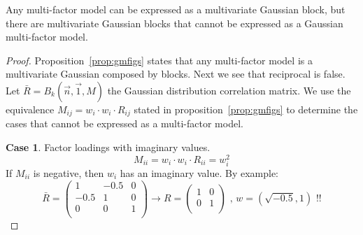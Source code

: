 \documentclass[11pt,fleqn]{book} %
\begin{document}
\begin{proposition}
	\label{prop:ibne}
	Any multi-factor model can be expressed as a multivariate Gaussian 
	block, but there are multivariate Gaussian blocks that cannot be 
	expressed as a Gaussian multi-factor model.
\end{proposition}
\begin{proof}
	Proposition~\ref{prop:gmfigs} states that any multi-factor model 
	is a multivariate Gaussian composed by blocks.
	Next we see that reciprocal is false. Let 
	$\bar{R} = B_k(\vec{n},\vec{1},M)$ the Gaussian distribution 
	correlation matrix. We use the equivalence 
	$M_{ij} = w_i \cdot w_i \cdot R_{ij}$ stated in 
	proposition~\ref{prop:gmfigs} to determine the cases that cannot be 
	expressed as a multi-factor model.

	\textbf{Case 1}. Factor loadings with imaginary values.
	\begin{displaymath}
		M_{ii} = w_i \cdot w_i \cdot R_{ii} = w_i^2
	\end{displaymath}
	If $M_{ii}$ is negative, then $w_i$ has an imaginary value.
	By example:
	\begin{displaymath}
		\bar{R} = \left(
		\begin{array}{cc|c}
			1    & -0.5 & 0 \\
			-0.5 & 1    & 0 \\
			\hline
			0    & 0    & 1 \\
		\end{array}
		\right) 
		\longrightarrow
		R = \left(
		\begin{array}{cc}
			1 & 0 \\
			0 & 1 \\
		\end{array}
		\right)
		\text{ , }
		w = (\sqrt{-0.5}, 1)
		\text{ !!}
	\end{displaymath}
	

\end{proof}
\end{document}
